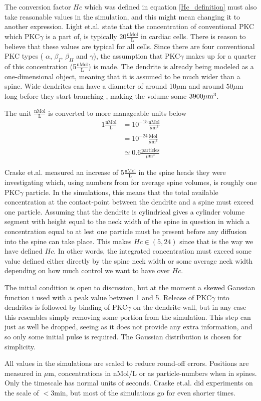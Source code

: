 The conversion factor $Hc$ which was defined in equation \eqref{Hc_definition} must also take reasonable values in the simulation, and this might mean changing it to another expression. 
Light et.al. \cite{light1996protein} state that the concentration of conventional PKC which PKC$\gamma$ is a part of, is typically 20$\frac{\text{nMol}}{\text{L}}$ in cardiac cells. 
There is reason to believe that these values are typical for all cells. 
Since there are four conventional PKC types ( $\alpha$, $\beta_{I}$, $\beta_{II}$ and $\gamma$), the assumption that PKC$\gamma$ makes up for a quarter of this concentration (5$\frac{\text{nMol}}{\text{L}}$) is made. 
The dendrite is already being modeled as a one-dimensional object, meaning that it is assumed to be much wider than a spine. 
Wide dendrites can have a diameter of around 10$\mu$m and around $50\mu$m long before they start branching \cite{wikipedia??}, making the volume some $3900\mu\text m^3$. 

The unit $\frac{\text{nMol}}{\text{L}}$ is converted to more manageable units below 
\begin{align*}
 1\frac{\text{nMol}}{\text{L}} &= 10^{-15}\frac{\text{nMol}}{\mu\text{m}^3}\\
 &= 10^{-24}\frac{\text{Mol}}{\mu\text{m}^3}\\
 &\simeq 0.6\frac{\text{particles}}{\mu\text{m}^3}
\end{align*}

Craske et.al. measured an increase of $5\frac{\text{nMol}}{\text{L}}$ in the spine heads they were investigating \cite{craske2005spines} which, using numbers from \cite{arellano2007ultrastructure} for average spine volumes, is roughly one PKC$\gamma$ particle. 
In the simulations, this means that the total available concentration at the contact-point between the dendrite and a spine must exceed one particle. 
Assuming that the dendrite is cylindrical gives a cylinder volume segment with height equal to the neck width of the spine in question in which a concentration equal to at lest one particle must be present before any diffusion into the spine can take place. 
This makes $Hc \in (5,24)$ since that is the way we have defined $Hc$. 
In other words, the integrated concentration must exceed some value defined either directly by the spine neck width or some average neck width depending on how much control we want to have over $Hc$.

The initial condition is open to discussion, but at the moment a skewed Gaussian function i used with a peak value between 1 and 5. 
Release of PKC$\gamma$ into dendrites is followed by binding of PKC$\gamma$ on the dendrite-wall, but in any case this resembles simply removing some portion from the simulation. 
This step can just as well be dropped, seeing as it does not provide any extra information, and so only some initial pulse is required. 
The Gaussian distribution is chosen for simplicity. 

All values in the simulations are scaled to reduce round-off errors. 
Positions are measured in $\mu$m, concentrations in nMol/L or as particle-numbers when in spines. Only the timescale has normal units of seconds. 
Craske et.al. did experiments on the scale of $<3$min, but most of the simulations go for even shorter times.